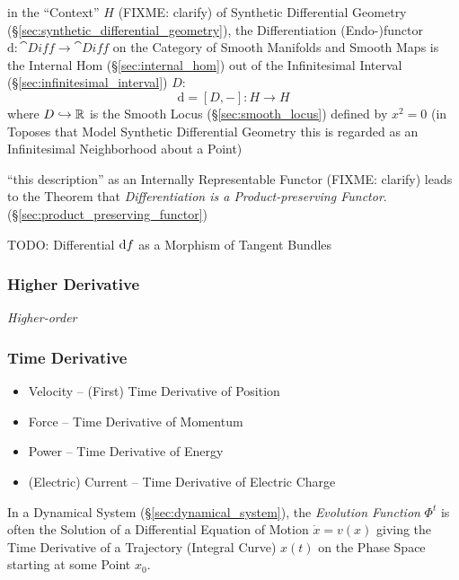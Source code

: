 in the ``Context'' $H$ (FIXME: clarify) of Synthetic Differential Geometry
(\S\ref{sec:synthetic_differential_geometry}), the Differentiation
(Endo-)functor $\mathrm{d} : \cat{Diff} \rightarrow \cat{Diff}$ on the Category
of Smooth Manifolds and Smooth Maps is the Internal Hom
(\S\ref{sec:internal_hom}) out of the Infinitesimal Interval
(\S\ref{sec:infinitesimal_interval}) $D$:
\[
  \mathrm{d} = [D,-] : H \rightarrow H
\]
where $D \hookrightarrow \mathbb{R}$ is the Smooth Locus (\S\ref{sec:smooth_locus})
defined by $x^2 = 0$ (in Toposes that Model Synthetic Differential Geometry this
is regarded as an Infinitesimal Neighborhood about a Point)

``this description'' as an Internally Representable Functor (FIXME: clarify)
leads to the Theorem that \emph{Differentiation is a Product-preserving
  Functor}. (\S\ref{sec:product_preserving_functor})

TODO: Differential $\mathrm{d}f$ as a Morphism of Tangent Bundles



\subsubsection{Higher Derivative}\label{sec:higher_derivative}

\emph{Higher-order}



\subsubsection{Time Derivative}\label{sec:time_derivative}

\begin{itemize}
  \item Velocity -- (First) Time Derivative of Position
  \item Force -- Time Derivative of Momentum
  \item Power -- Time Derivative of Energy
  \item (Electric) Current -- Time Derivative of Electric Charge
\end{itemize}

In a Dynamical System (\S\ref{sec:dynamical_system}), the \emph{Evolution
  Function} $\Phi^t$ is often the Solution of a Differential Equation of Motion
$\dot{x} = v(x)$ giving the Time Derivative of a Trajectory (Integral Curve)
$x(t)$ on the Phase Space starting at some Point $x_0$.



